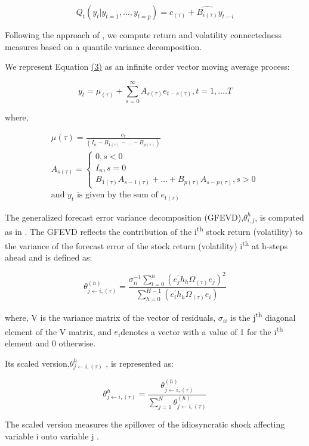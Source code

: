 \documentclass[
  number]{elsarticle}
\begin{document}
\[
Q_t(y_t |y_{t=1},\dots,y_{t=p})=c_{(\tau)}+\hat{B_{i(\tau)}} y_{t-i}
\]

Following the approach of \citep{Diebold.2014} , we compute return and
volatility connectedness measures based on a quantile variance
decomposition.

We represent Equation
\href{https://www.sciencedirect.com/science/article/pii/S1062940819304085\#e0015}{(3)}
as an infinite order vector moving average process:

\[
y_t=\mu_{(\tau)}+\sum_{s=0}^{\infty}A_{s(\tau)}e_{t-s(\tau)}, t=1,\dots.T
\]

where,

\begin{align*}
\mu{(\tau)}= \frac{c_{\tau}}{\left (I_n-B_{1(\tau)}-\dots-B_{p(\tau)} \right)} \\
A_{s(\tau)}= \begin{cases} 0, s<0 \\ I_n, s=0 \\ B_{1(\tau)}A_{s-1(\tau)}+\dots+B_{p(\tau)}A_{s-p(\tau)}, s>0 \end{cases} \\
\text{and $y_t$ is given by the sum of $e_{t(\tau)}$}
\end{align*}

The generalized forecast error variance decomposition
(GFEVD),\(\theta^h_{i,j}\), is computed as in \citep{Diebold.2014}. The
GFEVD reflects the contribution of the i\textsuperscript{th} stock
return (volatility) to the variance of the forecast error of the stock
return (volatility) i\textsuperscript{th} at h-steps ahead and is
defined as:

\[
\theta^{(h)}_{j \leftarrow i,(\tau)}= \frac{\sigma_{ii}^{-1}\sum_{l=0}^{h}(e_j^{'}h_h \Omega_{(\tau)} e_j)^2}{\sum_{h=0}^{H-1}(e_i^{'}h_h \Omega_{(\tau)} e_i)}
\]

where, V is the variance matrix of the vector of residuals,
\(\sigma_{ii}\) is the j\textsuperscript{th} diagonal element of the V
matrix, and \(e_i\)denotes a vector with a value of 1 for the
i\textsuperscript{th} element and 0 otherwise.

Its scaled version,\(\theta_{j\leftarrow i,(\tau)}^h\) , is represented
as:

\[
\theta_{j\leftarrow i,(\tau)}^h=\frac{\theta^{(h)}_{j \leftarrow i,(\tau)}}{\sum_{j=1}^N \theta^{(h)}_{j \leftarrow i,(\tau)}}
\]

The scaled version measures the spillover of the idiosyncratic shock
affecting variable i onto variable j \citep{Ando.2022}.
\end{document}
